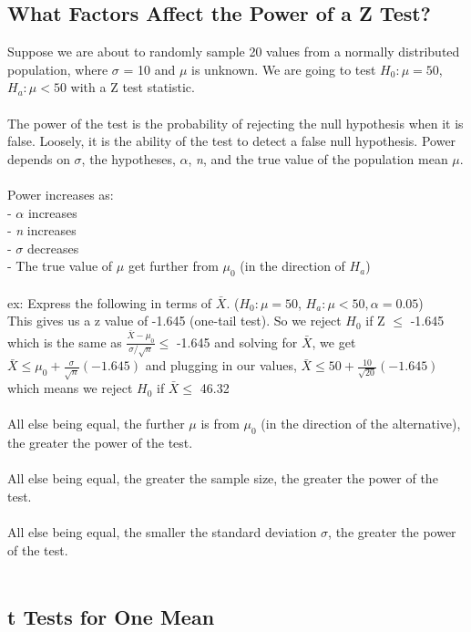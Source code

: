 \documentclass[12pt, a4paper]{article}
\begin{document}
	\subsection{What Factors Affect the Power of a Z Test?}
	Suppose we are about to randomly sample 20 values from a normally distributed population, where $\sigma$ = 10 and $\mu$ is unknown. We are going to test $H_0: \mu = 50$, $H_a: \mu < 50$ with a Z test statistic. \\~\\
	The power of the test is the probability of rejecting the null hypothesis when it is false. Loosely, it is the ability of the test to detect a false null hypothesis. Power depends on $\sigma$, the hypotheses, $\alpha$, \textit{n}, and the true value of the population mean $\mu$. \\~\\
	Power increases as: \\
	- $\alpha$ increases \\
	- \textit{n} increases \\
	- $\sigma$ decreases \\
	- The true value of $\mu$ get further from $\mu_0$ (in the direction of $H_a$) \\~\\
	ex: Express the following in terms of $\bar{X}$. ($H_0: \mu = 50$, $H_a: \mu < 50, \alpha = 0.05$) \\
	This gives us  a z value of -1.645 (one-tail test). So we reject $H_0$ if Z $\leq$ -1.645 which is the same as $\frac{\bar{X} - \mu_0}{\sigma/\sqrt{n}} \leq$ -1.645 and solving for $\bar{X}$, we get $\bar{X} \leq \mu_0 + \frac{\sigma}{\sqrt{n}} (-1.645)$ and plugging in our values, $\bar{X} \leq 50 + \frac{10}{\sqrt{20}}(-1.645)$ which means we reject $H_0$ if $\bar{X} \leq$ 46.32 \\~\\
	All else being equal, the further $\mu$ is from $\mu_0$ (in the direction of the alternative), the greater the power of the test. \\~\\
	All else being equal, the greater the sample size, the greater the power of the test. \\~\\
	All else being equal, the smaller the standard deviation $\sigma$, the greater the power of the test. \\~\\
	
	\subsection{t Tests for One Mean}
\end{document}
